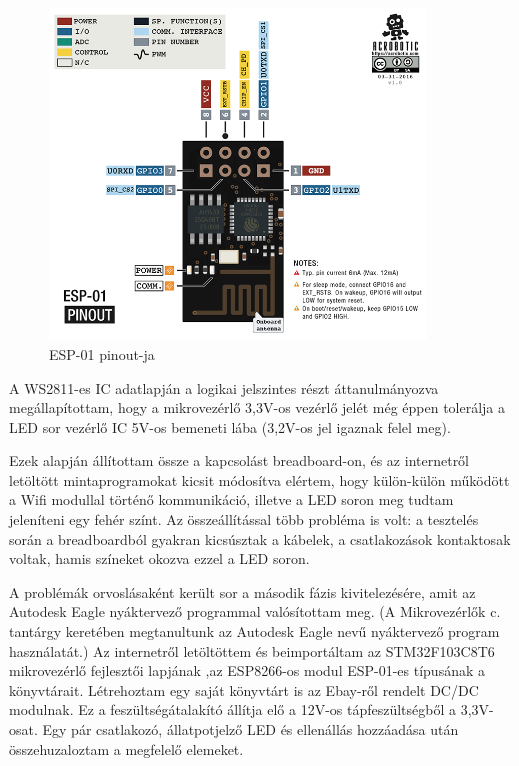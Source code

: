 \documentclass[../main.tex]{subfiles}
\begin{document}
        \begin{figure}[h!]
            \centering
                \includegraphics[width=10cm]{resources/pcb_res/esp8266_esp01_pinout.png}
            \caption{ESP-01 pinout-ja}
            \label{fig:eps01_pinout}
        \end{figure}
        
        A WS2811-es IC adatlapján a logikai jelszintes részt áttanulmányozva megállapítottam, hogy a mikrovezérlő 3,3V-os vezérlő jelét még éppen tolerálja a LED sor vezérlő IC 5V-os bemeneti lába (3,2V-os jel igaznak felel meg). 
        
        Ezek alapján állítottam össze a kapcsolást breadboard-on, és az internetről letöltött mintaprogramokat kicsit módosítva elértem, hogy külön-külön működött a Wifi modullal történő kommunikáció, illetve a LED soron meg tudtam jeleníteni egy fehér színt. Az összeállítással több probléma is volt: a tesztelés során a breadboardból gyakran kicsúsztak a kábelek, a csatlakozások kontaktosak voltak, hamis színeket okozva ezzel a LED soron. 
        
        A problémák orvoslásaként került sor a második fázis kivitelezésére, amit az Autodesk Eagle nyáktervező programmal valósítottam meg. (A Mikrovezérlők c. tantárgy keretében megtanultunk az Autodesk Eagle nevű nyáktervező program használatát.) Az internetről letöltöttem és beimportáltam az STM32F103C8T6 mikrovezérlő fejlesztői lapjának
        ,az ESP8266-os modul ESP-01-es 
        típusának a könyvtárait. Létrehoztam egy saját könyvtárt is az Ebay-ről rendelt DC/DC modulnak. Ez a feszültségátalakító állítja elő a 12V-os tápfeszültségből a 3,3V-osat. Egy pár csatlakozó, állatpotjelző LED és ellenállás hozzáadása után összehuzaloztam a megfelelő elemeket. 
        
\end{document}
